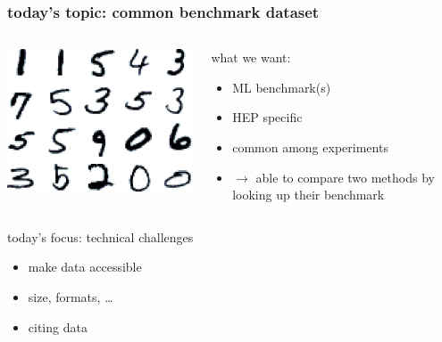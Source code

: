 \documentclass[table,xcolor=dvipsnames,professionalfonts]{beamer}
\begin{document}
\begin{frame}
  \frametitle{today's topic: common benchmark dataset}
  \begin{columns}
    \begin{column}{.35\textwidth}
      \includegraphics[width=\textwidth]{./mnist.png}
    \end{column}
    \begin{column}{.65\textwidth}
      what we want:
      \begin{itemize}
        \item ML benchmark(s)
        \item HEP specific
        \item common among experiments
        \item $\rightarrow$ able to compare two methods by looking up their benchmark
      \end{itemize}
    \end{column}
  \end{columns}
  \begin{block}{today's focus: technical challenges}
    \begin{itemize}
        \item make data accessible
        \item size, formats, \dots
        \item citing data
    \end{itemize}
  \end{block}
\end{frame}
\end{document}
